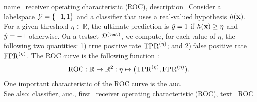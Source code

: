{name={receiver operating characteristic (ROC)}, 
	description={Consider a \gls{labelspace} $\mathcal{Y}=\{-1,1\}$ and a \gls{classifier} 
 		that uses a real-valued \gls{hypothesis} $h({\bf x})$. For a given 
 		threshold $\eta \in \mathbb{R}$, the ultimate \gls{prediction} is $\hat{y}=1$ 
 		if $h({\bf x})\geq \eta$ and $\hat{y}=-1$ otherwise. 
 		On a \gls{testset} $\mathcal{D}^{(\rm test)}$, we compute, for each value of $\eta$, 
		the following two quantities: 1) true positive rate ${\rm TPR}^{(\eta)}$; 
		and 2) false positive rate ${\rm FPR}^{(\eta)}$. 
 		The ROC curve is  
 		the following \gls{function} \cite{IntroROCFawcett}:
 		$${\rm ROC}: \mathbb{R} \rightarrow \mathbb{R}^{2}: \eta \mapsto \big({\rm TPR}^{(\eta)}, {\rm FPR}^{(\eta)} \big).$$ 
 	        One important characteristic of the ROC curve is the \gls{auc}.
	        \\ 
 		See also: \gls{classifier}, \gls{auc}.}, 
  	first={receiver operating characteristic (ROC)}, 
  	text={ROC}
}

